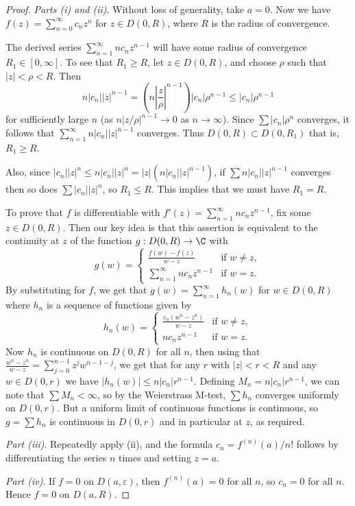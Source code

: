 \begin{proof}
    \emph{Parts (i) and (ii)}. Without loss of generality, take $a = 0$. Now we have $f(z) = \sum_{n = 0}^{\infty} c_n z^n$ for $z \in D(0, R)$, where $R$ is the radius of convergence.

    The derived series $\sum_{n = 1}^{\infty} n c_n z^{n - 1}$ will have some radius of convergence $R_1 \in [0, \infty]$. To see that $R_1 \geq R$, let $z \in D(0, R)$, and choose $\rho$ such that $|z| < \rho < R$. Then
    $$
n|c_n||z|^{n - 1} = \left(n \left|\frac{z}{\rho}\right|^{n - 1}\right)|c_n|\rho^{n - 1} \leq |c_n|\rho^{n - 1}
    $$
    for sufficiently large $n$ (as $n |z/\rho|^{n - 1} \rightarrow 0$ as $n \rightarrow \infty$). Since $\sum |c_n| \rho^n$ converges, it follows that $\sum_{n = 1}^{\infty} n|c_n||z|^{n - 1}$ converges. Thus $D(0, R) \subset D(0, R_1)$ that is, $R_1 \geq R$.

    Also, since $|c_n||z|^n \leq n |c_n| |z|^n = |z|(n |c_n||z|^{n - 1})$, if $\sum n |c_n||z|^{n - 1}$ converges then so does $\sum |c_n||z|^n$, so $R_1 \leq R$. This implies that we must have $R_1 = R$.

    To prove that $f$ is differentiable with $f'(z) = \sum_{n = 1}^{\infty} n c_n z^{n - 1}$, fix some $z \in D(0, R)$. Then our key idea is that this assertion is equivalent to the continuity at $z$ of the function $g: D(0, R) \rightarrow \C$ with
    $$
    g(w) =\begin{cases}
        \frac{f(w) -f(z)}{w - z} &\mbox{if } w \neq z, \\
        \sum_{n = 1}^{\infty} n c_n z^{n - 1} &\mbox{if } w = z.
       \end{cases}
    $$
    By substituting for $f$, we get that $g(w) = \sum_{n = 1}^{\infty} h_n(w)$ for $w \in D(0, R)$ where $h_n$ is a sequence of functions given by
    $$
h_n(w) = \begin{cases}
    \frac{c_n(w^n - z^n)}{w - z} &\mbox{if } w \neq z, \\
    n c_n z^{n - 1} &\mbox{if } w = z.
   \end{cases}
    $$
    Now $h_n$ is continuous on $D(0, R)$ for all $n$, then using that $\frac{w^n - z^n}{w - z} = \sum_{j = 0}^{n - 1} z^j w^{n - 1 - j}$, we get that for any $r$ with $|z| < r < R$ and any $w \in D(0, r)$ we have $|h_n(w)| \leq n|c_n|r^{n - 1}$. Defining $M_n = n |c_n|r^{n - 1}$, we can note that $\sum M_n < \infty$, so by the Weierstrass M-test, $\sum h_n$ converges uniformly on $D(0, r)$. But a uniform limit of continuous functions is continuous, so $g = \sum h_n$ is continuous in $D(0, r)$ and in particular at $z$, as required.

    \emph{Part (iii)}. Repeatedly apply (ii), and the formula $c_n = f^{(n)}(a)/n!$ follows by differentiating the series $n$ times and setting $z = a$.

    \emph{Part (iv)}. If $f = 0$ on $D(a, \varepsilon)$, then $f^{(n)}(a) = 0$ for all $n$, so $c_n = 0$ for all $n$. Hence $f = 0$ on $D(a, R)$.
\end{proof}


